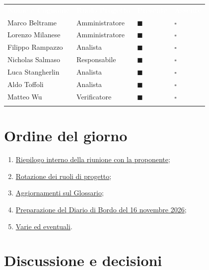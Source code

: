 \documentclass[12pt,a4paper]{article}
\newcommand{\tightlist}{\setlength{\itemsep}{1pt}\setlength{\parskip}{0pt}}
\begin{document}
\begin{center}
\begin{tabularx}{\linewidth}{>{\raggedright\arraybackslash}X>{\centering\arraybackslash}X>{\centering\arraybackslash}p{2.2cm}>{\centering\arraybackslash}p{2.2cm}}
\rowcolor{bfblue}\textcolor{white}{\textbf{Nome e Cognome}} & \textcolor{white}{\textbf{Ruolo Progetto}} & \textcolor{white}{\textbf{Presente}} & \textcolor{white}{\textbf{Assente}} \\
Marco Beltrame & Amministratore & $\blacksquare$ & $\square$ \\ \arrayrulecolor{bfline}\hline
Lorenzo Milanese & Amministratore & $\blacksquare$ & $\square$ \\ \arrayrulecolor{bfline}\hline
Filippo Rampazzo & Analista & $\blacksquare$ & $\square$ \\ \arrayrulecolor{bfline}\hline
Nicholas Salmaso & Responsabile & $\blacksquare$ & $\square$ \\ \arrayrulecolor{bfline}\hline
Luca Stangherlin & Analista & $\blacksquare$ & $\square$ \\ \arrayrulecolor{bfline}\hline
Aldo Toffoli & Analista & $\blacksquare$ & $\square$ \\ \arrayrulecolor{bfline}\hline
Matteo Wu & Verificatore & $\blacksquare$ & $\square$ \\ \arrayrulecolor{bfline}\hline
\end{tabularx}
\end{center}

\hypertarget{ordine-del-giorno}{%
\section{Ordine del giorno}}

\begin{enumerate}
\tightlist
\item \hyperlink{odg-1}{Riepilogo interno della riunione con la proponente};
\item \hyperlink{odg-2}{Rotazione dei ruoli di progetto};
\item \hyperlink{odg-3}{Aggiornamenti sul Glossario};
\item \hyperlink{odg-4}{Preparazione del Diario di Bordo del 16 novembre 2026};
\item \hyperlink{varie-ed-eventuali}{Varie ed eventuali}.
\end{enumerate}
\newpage

\hypertarget{discussione-e-decisioni}{%
\section{Discussione e decisioni}}
\end{document}
